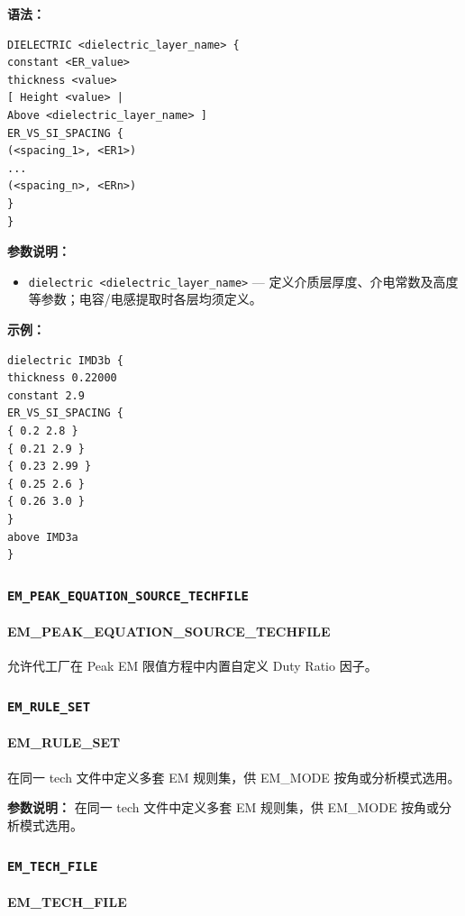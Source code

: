 \textbf{语法：}
\begin{lstlisting}
DIELECTRIC <dielectric_layer_name> {
constant <ER_value>
thickness <value>
[ Height <value> |
Above <dielectric_layer_name> ]
ER_VS_SI_SPACING {
(<spacing_1>, <ER1>)
...
(<spacing_n>, <ERn>)
}
}
\end{lstlisting}

\textbf{参数说明：}
\begin{itemize}
\item \texttt{dielectric <dielectric\_layer\_name>} — 定义介质层厚度、介电常数及高度等参数；电容/电感提取时各层均须定义。
\end{itemize}

\textbf{示例：}
\begin{lstlisting}
dielectric IMD3b {
thickness 0.22000
constant 2.9
ER_VS_SI_SPACING {
{ 0.2 2.8 }
{ 0.21 2.9 }
{ 0.23 2.99 }
{ 0.25 2.6 }
{ 0.26 3.0 }
}
above IMD3a
}
\end{lstlisting}

\subsubsection{\texttt{EM_PEAK_EQUATION_SOURCE_TECHFILE}}
\paragraph*{EM_PEAK_EQUATION_SOURCE_TECHFILE}

允许代工厂在 Peak EM 限值方程中内置自定义 Duty Ratio 因子。

\subsubsection{\texttt{EM_RULE_SET}}
\paragraph*{EM_RULE_SET}

在同一 tech 文件中定义多套 EM 规则集，供 EM_MODE 按角或分析模式选用。

\textbf{参数说明：}
在同一 tech 文件中定义多套 EM 规则集，供 EM\_MODE 按角或分析模式选用。

\subsubsection{\texttt{EM_TECH_FILE}}
\paragraph*{EM_TECH_FILE}

